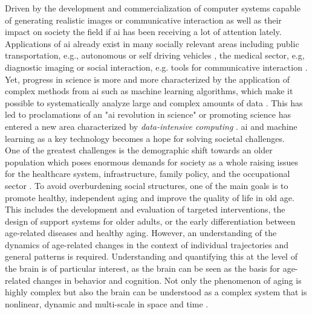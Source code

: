  
Driven by the development and commercialization of computer systems capable of generating realistic images or communicative interaction as well as their impact on society \cite{lin2023} the field if \gls{ai} has been receiving a lot of attention lately. Applications of \gls{ai} already exist in many socially relevant areas including public transportation, e.g., autonomous or self driving vehicles \cite{Leonard2020}, the medical sector, e.g, diagnostic imaging \cite{Liu2020} or social interaction, e.g. tools for communicative interaction \cite{Adamopoulou2020}. Yet, progress in science is more and more characterized by the application of complex methods from \gls{ai} such as machine learning algorithms, which make it possible to systematically analyze large and complex amounts of data \cite{Brunton2019}. This has led to proclamations of an "\gls{ai} revolution in science" \cite{Appenzeller2017} or promoting science has entered a new area characterized by \textit{data-intensive computing} \cite{Hey2009}. \Gls{ai} and machine learning as a key technology becomes a hope for solving societal challenges.\\
One of the greatest challenges is the demographic shift towards an older population which poses enormous demands for society as a whole raising issues for the healthcare system, infrastructure, family policy, and the occupational sector \cite{who_aging2023}. To avoid overburdening social structures, one of the main goals is to promote healthy, independent aging and improve the quality of life in old age. This includes the development and evaluation of targeted interventions, the design of support systems for older adults, or the early differentiation between age-related diseases and healthy aging. However, an understanding of the dynamics of age-related changes in the context of individual trajectories and general patterns is required. Understanding and quantifying this at the level of the brain is of particular interest, as the brain can be seen as the basis for age-related changes in behavior and cognition. Not only the phenomenon of aging is highly complex but also the brain can be understood as a complex system that is nonlinear, dynamic and multi-scale in space and time \cite{Betzel2017}.\\ 
